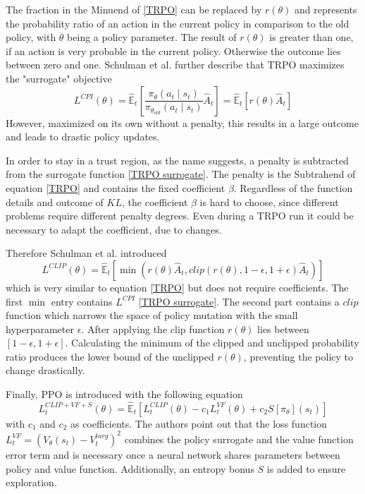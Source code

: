 The fraction in the Minuend of \eqref{TRPO} can be replaced by $r(\theta)$
and represents the probability ratio of an action in the current policy in comparison to the old policy, with $\theta$ being a policy parameter. The result of $r(\theta)$ is greater than one, if an action is very probable in the current policy. Otherwise the outcome lies between zero and one. Schulman et al. further describe that TRPO maximizes the "surrogate" objective
\begin{equation}\label{TRPO surrogate}
    L^{CPI}(\theta) = \hat{\mathbb{E}}_{t} \left[ \frac{\pi_{\theta}(a_{t} \mid s_{t})}{\pi_{\theta_{old}}(a_{t} \mid s_{t})} \hat{A}_{t} \right]
    = \hat{\mathbb{E}}_{t} \left[ r(\theta)\hat{A}_{t} \right]
\end{equation}
However, maximized on its own without a penalty, this results in a large outcome and leads to drastic policy updates.

In order to stay in a trust region, as the name suggests, a penalty is subtracted from the surrogate function \eqref{TRPO surrogate}. The penalty is the Subtrahend of equation \eqref{TRPO} and contains the fixed coefficient $\beta$. Regardless of the function details and outcome of $KL$, the coefficient $\beta$ is hard to choose, since different problems require different penalty degrees. Even during a TRPO run it could be necessary to adapt the coefficient, due to changes.

Therefore Schulman et al. introduced
\begin{equation}\label{PPO}
    L^{CLIP}(\theta) = \hat{\mathbb{E}}_{t} \left[ \min(r(\theta)\hat{A}_{t},clip(r(\theta), 1-\epsilon, 1+\epsilon)\hat{A}_{t}) \right]
\end{equation}
which is very similar to equation \eqref{TRPO} but does not require coefficients. The first $\min$ entry contains $L^{CPI}$ \eqref{TRPO surrogate}. The second part contains a $clip$ function which narrows the space of policy mutation with the small hyperparameter $\epsilon$. After applying the clip function $r(\theta)$ lies between $[1-\epsilon,1+\epsilon]$. Calculating the minimum of the clipped and unclipped probability ratio produces the lower bound of the unclipped $r(\theta)$, preventing the policy to change drastically.

Finally, PPO is introduced with the following equation
\begin{equation}\label{PPO Algorithm}
    L_{t}^{CLIP+VF+S}(\theta) = \hat{\mathbb{E}}_{t} \left[ L_{t}^{CLIP}(\theta) - c_{1}L_{t}^{VF}(\theta) + c_{2}S[\pi_{\theta}](s_{t}) \right]
\end{equation}
with $c_{1}$ and $c_{2}$ as coefficients. The authors point out that the loss function \\
$L_{t}^{VF} = (V_{\theta}(s_{t})-V_{t}^{targ})^2$ combines the policy surrogate and the value function error term and is necessary once a neural network shares parameters between policy and value function. Additionally, an entropy bonus $S$ is added to ensure exploration.

